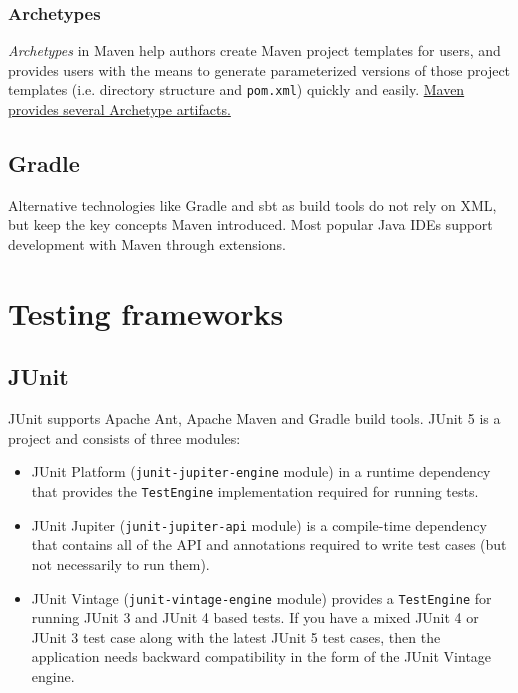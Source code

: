 \documentclass[8pt, table, xcdraw]{article}%
\begin{document}
\subsubsection{Archetypes}

\emph{Archetypes} in Maven help authors create Maven project templates for users, and provides users with the means to generate parameterized versions of those project templates (i.e. directory structure and \lstinline{pom.xml}) quickly and easily. \href{https://maven.apache.org/guides/introduction/introduction-to-archetypes.html}{Maven provides several Archetype artifacts.} 

\subsection{Gradle}

Alternative technologies like Gradle and sbt as build tools do not rely on XML, but keep the key concepts Maven introduced. Most popular Java IDEs support development with Maven through extensions.

\section{Testing frameworks}

\subsection{JUnit}

JUnit supports Apache Ant, Apache Maven and Gradle build tools. JUnit 5 is a project and consists of three modules:

\begin{itemize}
    \item JUnit Platform (\lstinline{junit-jupiter-engine} module) in a runtime dependency that provides the \lstinline{TestEngine} implementation required for running tests.
    \item JUnit Jupiter (\lstinline{junit-jupiter-api} module) is a compile-time dependency that contains all of the API and annotations required to write test cases (but not necessarily to run them).
    \item JUnit Vintage (\lstinline{junit-vintage-engine} module) provides a \lstinline{TestEngine} for running JUnit 3 and JUnit 4 based tests. If you have a mixed JUnit 4 or JUnit 3 test case along with the latest JUnit 5 test cases, then the application needs backward compatibility in the form of the JUnit Vintage engine.
\end{itemize}
\end{document}
